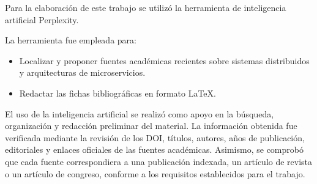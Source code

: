 \documentclass[11pt]{article}
\begin{document}
Para la elaboración de este trabajo se utilizó la herramienta de inteligencia artificial {Perplexity}.

La herramienta fue empleada para:

\begin{itemize}
    \item Localizar y proponer fuentes académicas recientes sobre sistemas distribuidos y arquitecturas de microservicios.
    \item Redactar las fichas bibliográficas en formato LaTeX.
\end{itemize}

El uso de la inteligencia artificial se realizó como apoyo en la búsqueda, organización y redacción preliminar del material. La información obtenida fue verificada mediante la revisión de los DOI, títulos, autores, años de publicación, editoriales y enlaces oficiales de las fuentes académicas. Asimismo, se comprobó que cada fuente correspondiera a una publicación indexada, un artículo de revista o un artículo de congreso, conforme a los requisitos establecidos para el trabajo.
\end{document}
